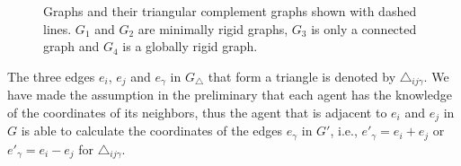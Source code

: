 \documentclass[times]{rncauth}
\begin{document}
\begin{figure}
\caption{Graphs and their triangular complement graphs shown with
dashed lines. $G_1$ and $G_2$ are minimally rigid graphs, $G_3$ is
only a connected graph and $G_4$ is a globally rigid
graph.}\label{fig:example_triangular}
\end{figure}


The three edges $e_i$, $e_j$ and $e_\gamma$ in $G_\triangle$ that
form a triangle is denoted by $\triangle_{ij\gamma}$. We have made
the assumption in the preliminary  that each agent has the knowledge
of the coordinates of its neighbors, thus the agent that is adjacent
to $e_i$ and $e_j$ in $G$ is able to calculate the coordinates of
the edges $e_\gamma$ in $G'$, i.e., $e'_\gamma=e_i+e_j$ or
$e'_\gamma=e_i-e_j$ for $\triangle_{ij\gamma}$.
\end{document}
